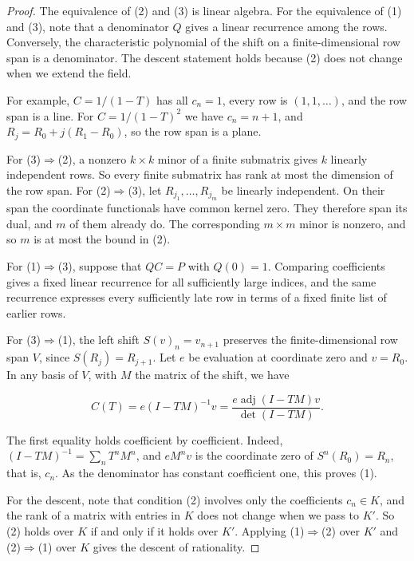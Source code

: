 \documentclass[11pt]{article}
\begin{document}
\begin{proof}[{Proof}]\label{bp331}%
The equivalence of (2) and (3) is linear algebra. For the equivalence of (1) and (3), note that a denominator \(Q\) gives a linear recurrence among the rows. Conversely, the characteristic polynomial of the shift on a finite-dimensional row span is a denominator. The descent statement holds because (2) does not change when we extend the field.

For example, \(C=1/(1-T)\) has all \(c_n=1\), every row is \((1,1,\ldots)\), and the row span is a line. For \(C=1/(1-T)^2\) we have \(c_n=n+1\), and \(R_j=R_0+j(R_1-R_0)\), so the row span is a plane.

For (3)\(\Rightarrow\)(2), a nonzero \(k\times k\) minor of a finite submatrix gives \(k\) linearly independent rows. So every finite submatrix has rank at most the dimension of the row span. For (2)\(\Rightarrow\)(3), let \(R_{j_1},\ldots,R_{j_m}\) be linearly independent. On their span the coordinate functionals have common kernel zero. They therefore span its dual, and \(m\) of them already do. The corresponding \(m\times m\) minor is nonzero, and so \(m\) is at most the bound in (2).

For (1)\(\Rightarrow\)(3), suppose that \(QC=P\) with \(Q(0)=1\). Comparing coefficients gives a fixed linear recurrence for all sufficiently large indices, and the same recurrence expresses every sufficiently late row in terms of a fixed finite list of earlier rows.

For (3)\(\Rightarrow\)(1), the left shift \(S(v)_n=v_{n+1}\) preserves the finite-dimensional row span \(V\), since \(S(R_j)=R_{j+1}\). Let \(e\) be evaluation at coordinate zero and \(v=R_0\). In any basis of \(V\), with \(M\) the matrix of the shift, we have

\[
C(T)=e(I-TM)^{-1}v
=\frac{e\operatorname{adj}(I-TM)v}{\det(I-TM)}.
\]

The first equality holds coefficient by coefficient. Indeed, \((I-TM)^{-1}=\sum_nT^nM^n\), and \(eM^nv\) is the coordinate zero of \(S^n(R_0)=R_n\), that is, \(c_n\). As the denominator has constant coefficient one, this proves (1).

For the descent, note that condition (2) involves only the coefficients \(c_n\in K\), and the rank of a matrix with entries in \(K\) does not change when we pass to \(K'\). So (2) holds over \(K\) if and only if it holds over \(K'\). Applying (1)\(\Rightarrow\)(2) over \(K'\) and (2)\(\Rightarrow\)(1) over \(K\) gives the descent of rationality.
\end{proof}
\end{document}
